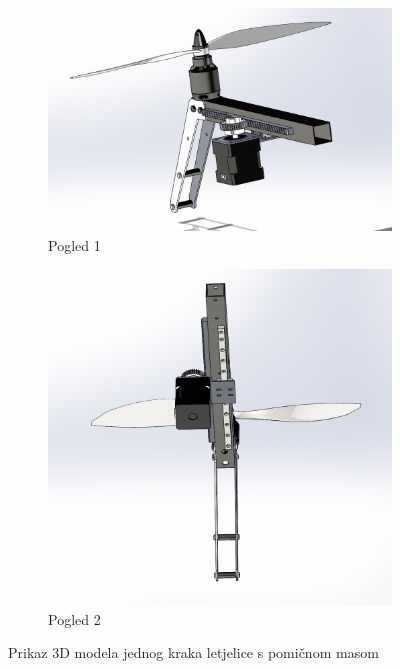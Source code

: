 \documentclass[11pt,a4paper]{article}
\begin{document}
\begin{figure}[H]
\centering
\begin{subfigure}{.5\textwidth}
  \centering
  \includegraphics[width=.9\linewidth]{figures/arm_assembly1.png}
  \caption{Pogled 1}
  \label{fig:sub1}
\end{subfigure}%
\begin{subfigure}{.5\textwidth}
  \centering
  \includegraphics[width=.9\linewidth]{figures/arm_assembly2.png}
  \caption{Pogled 2}
  \label{fig:sub2}
\end{subfigure}
\caption{Prikaz 3D modela jednog kraka letjelice s pomičnom masom}
\label{fig:arm_assembly}
\end{figure}
\end{document}
